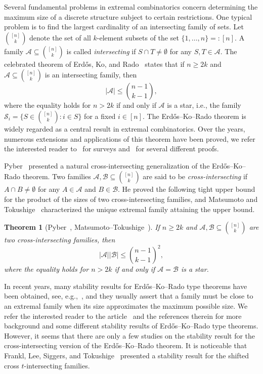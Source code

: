 \documentclass[11pt]{article}
\numberwithin{equation}{section}
\newtheorem{theorem}{Theorem}[section]
\def\A{\mathcal{A}}
\def\B{\mathcal{B}}
\def\S{\mathcal{S}}
\begin{document}
Several fundamental problems in extremal combinatorics
concern determining the maximum size of a discrete structure
subject to certain restrictions.
One typical problem is to find the largest cardinality of an intersecting family of sets.
Let $\binom{[n]}{k}$ denote the set of all $k$-element subsets of the set
$\{1,\ldots,n\}=:[n]$.
A family $\A \subseteq \binom{[n]}{k}$ is called {\em intersecting} if
$S\cap T\neq \emptyset$ for any $S,T\in \A$.
The celebrated theorem of Erd\H{o}s, Ko, and Rado~\cite{Erdos} states that
if $n\geq 2k$ and $\A \subseteq \binom{[n]}{k}$ is an intersecting family,
then
$$|\A| \leq \binom{n-1}{k-1},$$
where the equality holds for $n>2k$ if and only if $\A$ is a star, i.e., the family $\S_i=\{S\in \binom{[n]}{k}: i\in S\}$ for a fixed $i\in[n]$.
The Erd\H{o}s--Ko--Rado theorem is widely regarded as a central result in extremal combinatorics.
Over the years, numerous extensions and applications of this theorem have been proved, we refer the interested reader to~\cite{Deza,FTsurvey} for surveys and~\cite{Frankl} for several different proofs.








Pyber~\cite{Pyber} presented a natural cross-intersecting generalization
of the Erd\H{o}s--Ko--Rado theorem.
Two families $\A,\B\subseteq \binom{[n]}{k}$ are said to be {\em cross-intersecting} if $A\cap B\neq \emptyset$
for any $A\in \A$ and $B\in \B$.
He proved the following tight upper bound for the product of the sizes of
two cross-intersecting families, and Matsumoto and Tokushige~\cite{Matsumoto} characterized the unique extremal family attaining the upper bound.


\begin{theorem}[Pyber~\cite{Pyber}, Matsumoto--Tokushige~\cite{Matsumoto}]\label{EKRcross}
If $n \geq 2k$ and $\A,\B\subseteq \binom{[n]}{k}$ are two cross-intersecting families, then
$$|\A||\B|\leq \binom{n-1}{k-1}^2,$$
where the equality holds for $n>2k$ if and only if $\A=\B$ is a star.
\end{theorem}









In recent years, many stability results for Erd\H{o}s--Ko--Rado type theorems have been obtained, see, e.g.,~\cite{FriedgutCom08,Keevashshadow},
and they usually assert that
a family must be close to an extremal family
when its size approximates the maximum possible size.
We refer the interested reader to the article~\cite{EllisJEMS2019} and the references therein for more background and some different   stability results of Erd\H{o}s--Ko--Rado type theorems.
However, %
it seems that there are only a few studies on the stability result for the cross-intersecting version of the Erd\H{o}s--Ko--Rado theorem.
It is noticeable that Frankl, Lee, Siggers, and
Tokushige~\cite[Theorem 1.2]{FLST}
presented a stability result for the shifted cross $t$-intersecting families.
\end{document}
